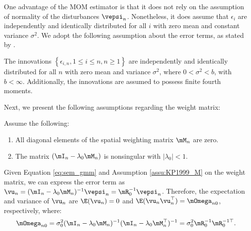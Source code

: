 One advantage of the MOM estimator is that it does not rely on the assumption of normality of the disturbances $\vepsi_n$. Nonetheless, it does assume that $\epsilon_i$ are independently and identically distributed for all $i$ with zero mean and constant variance $\sigma^2$. We adopt the following assumption about the error terms, as stated by \cite{kelejian1999generalized}.

\begin{assumption}\label{assu:errors_triang_homokedastic}
The innovations $\left\lbrace \epsilon_{i,n}, 1 \leq i \leq n, n\geq 1\right\rbrace$ are independently and identically distributed for all $n$ with zero mean and variance $\sigma^2$, where $0 < \sigma^2 < b$, with $b < \infty$. Additionally, the innovations are assumed to possess finite fourth moments. 
\end{assumption}

Next, we present the following assumptions regarding the weight matrix:

\begin{assumption}\label{assu:KP1999_M} Assume the following:
\begin{enumerate}
  \item All diagonal elements of the spatial weighting matrix $\mM_n$ are zero.
  \item The matrix $(\mI_n - \lambda_0\mM_n)$ is nonsingular with $\left|\lambda_0 \right|<1$.
\end{enumerate}
\end{assumption}

Given Equation \eqref{eq:sem_gmm}  and Assumption \ref{assu:KP1999_M} on the weight matrix, we can express the error term as $\vu_n = (\mI_n - \lambda_0 \mM_n)^{-1}\vepsi_n = \mR_0^{-1}\vepsi_n$. Therefore, the expectation and variance of $\vu_n$ are $\E(\vu_n) = 0$ and $\E(\vu_n\vu^\top_n) = \mOmega_{n0}$, respectively, where:
\begin{equation*}
  \mOmega_{n0} = \sigma^2_{0}(\mI_n - \lambda_0\mM_n)^{-1}(\mI_n - \lambda_0\mM_n^\top)^{-1} = \sigma_{0}^2\mR_0^{-1}\mR_0^{-1\top}.
\end{equation*}

